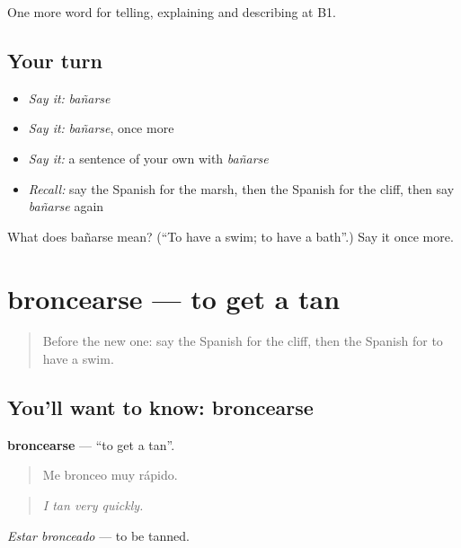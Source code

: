\begin{grammarlens}[title={What you've built}]
One more word for telling, explaining and describing at B1.
\end{grammarlens}

\subsection*{Your turn}
\begin{itemize}
\raggedright
  \item \emph{Say it:} \emph{bañarse}
  \item \emph{Say it:} \emph{bañarse}, once more
  \item \emph{Say it:} a sentence of your own with \emph{bañarse}
  \item \emph{Recall:} say the Spanish for the marsh, then the Spanish for the cliff, then say \emph{bañarse} again
\end{itemize}

\begin{tcolorbox}[breakable,colback=teal!4,colframe=teal!35!black,title={Before you move on}]
What does bañarse mean? (\textquotedblleft{}To have a swim; to have a bath\textquotedblright{}.) Say it once more.
\end{tcolorbox}
\section[broncearse]{broncearse — to get a tan}

\label{lesson:ES-C690-broncearse}



\begin{quote}
Before the new one: say the Spanish for the cliff, then the Spanish for to have a swim.
\end{quote}

\subsection*{You'll want to know: broncearse}
\textbf{broncearse} — \textquotedblleft{}to get a tan\textquotedblright{}.

\begin{quote}
Me bronceo muy rápido.
\end{quote}

\begin{quote}
\emph{I tan very quickly.}
\end{quote}

\emph{Estar bronceado} — to be tanned.

